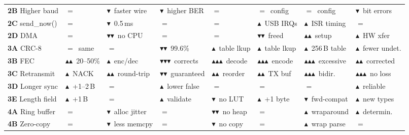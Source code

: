 \documentclass[11pt,a4paper]{article}
\newcommand{\tactic}[1]{\textbf{#1}}
\newcommand{\metricdown}{$\blacktriangledown$}
\newcommand{\metricup}{$\blacktriangle$}
\newcommand{\metriceq}{$=$}
\begin{document}
{\begin{longtable}{|l|C{1.5cm}|C{1.3cm}|C{1.3cm}|C{1.3cm}|C{1.3cm}|C{1.7cm}|C{1.5cm}|}
\tactic{2B} Higher baud &
\metriceq &
\metricdown\ faster wire &
\metricdown\ higher BER &
\metriceq &
\metriceq\ config &
\metriceq\ config &
\metricdown\ bit errors \\

\tactic{2C} send\_now() &
\metriceq &
\metricdown\ 0.5\,ms &
\metriceq &
\metriceq &
\metricup\ USB IRQs &
\metricup\ ISR timing &
\metriceq \\

\tactic{2D} DMA &
\metriceq &
\metricdown\metricdown\ no CPU &
\metriceq &
\metriceq &
\metricdown\metricdown\ freed &
\metricup\metricup\ setup &
\metricup\ HW xfer \\

\tactic{3A} CRC-8 &
\metriceq\ same &
\metriceq &
\metricdown\metricdown\ 99.6\% &
\metricup\ table lkup &
\metricup\ table lkup &
\metricup\ 256\,B table &
\metricup\ fewer undet. \\

\tactic{3B} FEC &
\metricup\metricup\ 20--50\% &
\metricup\ enc/dec &
\metricdown\metricdown\metricdown\ corrects &
\metricup\metricup\metricup\ decode &
\metricup\metricup\metricup\ encode &
\metricup\metricup\metricup\ excessive &
\metricup\metricup\ corrected \\

\tactic{3C} Retransmit &
\metricup\ NACK &
\metricup\metricup\ round-trip &
\metricdown\metricdown\ guaranteed &
\metricup\metricup\ reorder &
\metricup\metricup\ TX buf &
\metricup\metricup\metricup\ bidir. &
\metricup\metricup\metricup\ no loss \\

\tactic{3D} Longer sync &
\metricup\ +1--2\,B &
\metriceq &
\metricup\ lower false &
\metriceq &
\metriceq &
\metriceq &
\metricup\ reliable \\

\tactic{3E} Length field &
\metricup\ +1\,B &
\metriceq &
\metricup\ validate &
\metricdown\ no LUT &
\metricup\ +1 byte &
\metricdown\ fwd-compat &
\metricup\ new types \\

\tactic{4A} Ring buffer &
\metriceq &
\metricdown\ alloc jitter &
\metriceq &
\metricdown\metricdown\ no heap &
\metriceq &
\metricup\ wraparound &
\metricup\ determin. \\

\tactic{4B} Zero-copy &
\metriceq &
\metricdown\ less memcpy &
\metriceq &
\metricdown\ no copy &
\metriceq &
\metricup\ wrap parse &
\metriceq \\


\end{longtable}}
\end{document}

